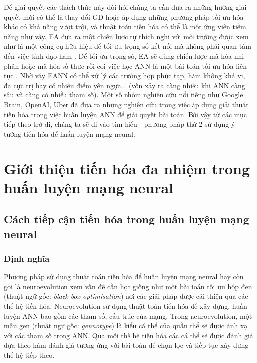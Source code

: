     Để giải quyết các thách thức này đòi hỏi chúng ta cần đưa ra những hướng giải quyết mới có thể là thay đổi GD hoặc áp dụng những phương pháp tối ưu hóa khác có khả năng vượt trội, và thuật toán tiến hóa có thể là một ứng viên tiềm năng như vậy. EA đưa ra một chiến lược tự thích nghi với môi trường được xem như là một công cụ hữu hiệu để tối ưu trọng số kết nối mà không phải quan tâm đến việc tính đạo hàm \cite{whitley1990genetic}. Để tối ưu trọng sô, EA sẽ dùng chiến lược mã hóa nhị phân hoặc mã hóa số thực rồi coi việc học ANN là một bài toán tối ưu hóa liên tục \cite{yao1999evolutionary}. Nhờ vậy EANN có thể xử lý các trường hợp phức tạp, hàm không khả vi, đa cực trị hay có nhiều điểm yên ngựa... (vốn xảy ra càng nhiều khi ANN càng sâu và càng có nhiều tham số). Một số nhóm nghiên cứu nổi tiếng như Google Brain, OpenAI, Uber \cite{wong2018transfer, salimans2017evolution} đã đưa ra những nghiên cứu trong việc áp dụng giải thuật tiến hóa trong việc huấn luyện ANN để giải quyết bài toán. 
    Bởi vậy từ các mục tiếp theo trở đi, chúng ta sẽ đi vào tìm hiểu - phương pháp thứ 2 sử dụng ý tưởng tiến hóa để huấn luyện mạng neural. 
\section{Giới thiệu tiến hóa đa nhiệm trong huấn luyện mạng neural}
    \subsection{Cách tiếp cận tiến hóa trong huấn luyện mạng neural}
    \subsubsection{Định nghĩa}
    Phương pháp sử dụng thuật toán tiến hóa để huấn luyện mạng neural hay còn gọi là neuroevolution \cite{floreano2008neuroevolution} xem vấn đề cần học giống như một bài toán tối ưu hộp đen (thuật ngữ gốc: \emph{black-box optimisation}) nơi các giải pháp được cải thiện qua các thế hệ tiến hóa. Neuroevolution sử dụng thuật toán tiến hóa để xây dựng, huấn luyện ANN bao gồm các tham số, cấu trúc của mạng. Trong neuroevolution, một mẫu gen (thuật ngữ gốc: \emph{gennotype}) là kiểu cá thể của quần thể sẽ được ánh xạ với các tham số trong ANN. Qua mỗi thế hệ tiến hóa các cá thể sẽ được đánh giá dựa theo hàm đánh giá tương ứng với bài toán để chọn lọc và tiếp tục xây dựng thế hệ tiếp theo.
